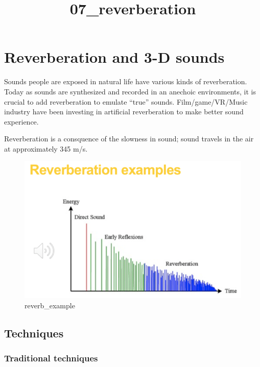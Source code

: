 \documentclass[11pt]{article}
\title{07\_reverberation}
\makeatletter
\def\maxwidth{\ifdim\Gin@nat@width>\linewidth\linewidth
    \else\Gin@nat@width\fi}
\let\Oldincludegraphics\includegraphics
\renewcommand{\includegraphics}[1]{\Oldincludegraphics[width=.8\maxwidth]{#1}}
\makeatother
\begin{document}
    
    
    \maketitle
    
    

    
    \hypertarget{reverberation-and-3-d-sounds}{%
\section{Reverberation and 3-D
sounds}\label{reverberation-and-3-d-sounds}}

Sounds people are exposed in natural life have various kinds of
reverberation. Today as sounds are synthesized and recorded in an
anechoic environments, it is crucial to add reverberation to emulate
``true'' sounds. Film/game/VR/Music industry have been investing in
artificial reverberation to make better sound experience.

Reverberation is a consquence of the slowness in sound; sound travels in
the air at approximately 345 m/s.

\begin{figure}
\centering
\includegraphics{images/reverb_example.png}
\caption{reverb\_example}
\end{figure}

    \hypertarget{techniques}{%
\subsection{Techniques}\label{techniques}}

\hypertarget{traditional-techniques}{%
\subsubsection{Traditional techniques}\label{traditional-techniques}}
\end{document}

